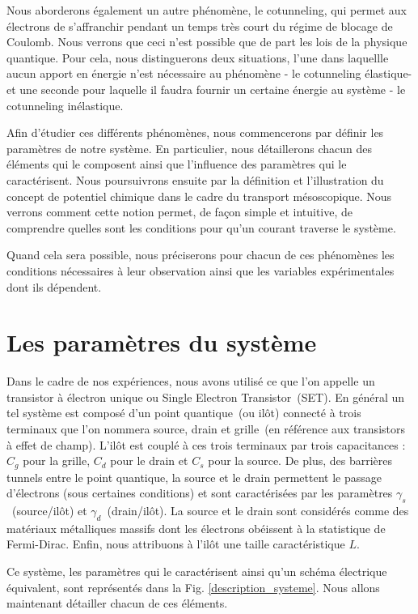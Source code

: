 Nous aborderons également un autre phénomène, le cotunneling, qui permet aux électrons de s'affranchir pendant un temps très court du régime de blocage de Coulomb. Nous verrons que ceci n'est possible que de part les lois de la physique quantique. Pour cela, nous distinguerons deux situations, l'une dans laquellle aucun apport en énergie n'est nécessaire au phénomène - le cotunneling élastique- et une seconde pour laquelle il faudra fournir un certaine énergie au système - le cotunneling inélastique.

Afin d'étudier ces différents phénomènes, nous commencerons par définir les paramètres de notre système. En particulier, nous détaillerons chacun des éléments qui le composent ainsi que l'influence des paramètres qui le caractérisent. Nous poursuivrons ensuite par la définition et l'illustration du concept de potentiel chimique dans le cadre du transport mésoscopique. Nous verrons comment cette notion permet, de façon simple et intuitive, de comprendre quelles sont les conditions pour qu'un courant traverse le système.

Quand cela sera possible, nous préciserons pour chacun de ces phénomènes les conditions nécessaires à leur observation ainsi que les variables expérimentales dont ils dépendent.


\section{Les paramètres du système}
Dans le cadre de nos expériences, nous avons utilisé ce que l'on appelle un transistor à électron unique ou Single Electron Transistor~(SET). En général un tel système est composé d'un point quantique~(ou ilôt) connecté à trois terminaux que l'on nommera source, drain et grille~(en référence aux transistors à effet de champ). L'il\^ot est couplé à ces trois terminaux par trois capacitances : $C_g$ pour la grille, $C_d$ pour le drain et $C_s$ pour la source. De plus, des barrières tunnels entre le point quantique, la source et le drain permettent le passage d'électrons (sous certaines conditions) et sont caractérisées par les paramètres $\gamma_s$~(source/il\^ot) et $\gamma_d$~(drain/il\^ot). La source et le drain sont considérés comme des matériaux métalliques massifs dont les électrons obéissent à la statistique de Fermi-Dirac. Enfin, nous attribuons à l'il\^ot une taille caractéristique $L$. 

Ce système, les paramètres qui le caractérisent ainsi qu'un schéma électrique équivalent, sont représentés dans la Fig. \ref{description_systeme}. Nous allons maintenant détailler chacun de ces éléments.


